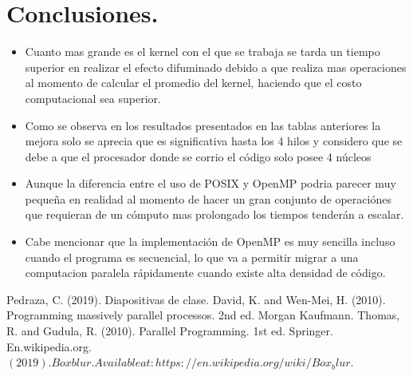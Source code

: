 \documentclass{IEEEtran}
\begin{document}
\section*{Conclusiones.}
\begin{itemize}
  \item Cuanto mas grande es el kernel con el que se trabaja se tarda un tiempo superior en realizar el efecto difuminado debido a que realiza mas operaciones al momento de calcular el promedio del kernel, haciendo que el costo computacional sea superior.
  \item Como se observa en los resultados presentados en las tablas anteriores la mejora solo se aprecia que es significativa hasta los 4 hilos y considero que se debe a que el procesador donde se corrio el código  solo posee 4 núcleos
  \item Aunque la diferencia entre el uso de POSIX y OpenMP podria parecer muy pequeña en realidad al momento de hacer un gran conjunto de  operaciónes que requieran de un cómputo mas prolongado los tiempos tenderán a escalar.
  \item Cabe mencionar que la implementación de OpenMP es muy sencilla incluso cuando el programa es secuencial, lo que va a permitir migrar a una computacion paralela rápidamente cuando existe alta densidad de código.
\end{itemize}


\noindent 


\begin{thebibliography}{00}
 Pedraza, C. (2019). Diapositivas de clase.
David, K. and Wen-Mei, H. (2010). Programming massively parallel processos. 2nd ed. Morgan Kaufmann.
 Thomas, R. and Gudula, R. (2010). Parallel Programming. 1st ed. Springer.
 En.wikipedia.org. $(2019). Box blur.  Available at: https://en.wikipedia.org/wiki/Box_blur.$
\end{thebibliography}




\end{document}
